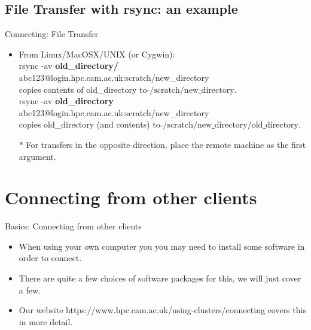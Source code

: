 \subsection{File Transfer with rsync: an example}
\begin{frame}{Connecting: File Transfer}
\begin{itemize}
\item From Linux/MacOSX/UNIX (or Cygwin):\hfill\\
\alert{\footnotesize rsync -av \textbf{old\_directory/} abc123@login.hpc.cam.ac.uk:scratch/new\_directory}\hfill\\
copies contents of old\_directory to $\tilde{}\text{/scratch/new\_directory}$.\hfill\\\smallskip
\pause
\alert{\footnotesize rsync -av \textbf{old\_directory} abc123@login.hpc.cam.ac.uk:scratch/new\_directory}\hfill\\
copies old\_directory (and contents) to $\tilde{}\text{/scratch/new\_directory/old\_directory}$.\hfill\\
\pause
\item[$\ast$]For transfers in the opposite direction, place the remote machine as the first argument.
\end{itemize}
\end{frame}
%
\section{Connecting from other clients}
\begin{frame}{Basics: Connecting from other clients}
\begin{itemize}
\item{When using your own computer you you may need to install some software in order to connect.}
\pause
\item{There are quite a few choices of software packages for this, we will just cover a few.}
\pause
\item{Our website https://www.hpc.cam.ac.uk/using-clusters/connecting covers this in more detail.}
\end{itemize}
\end{frame}

